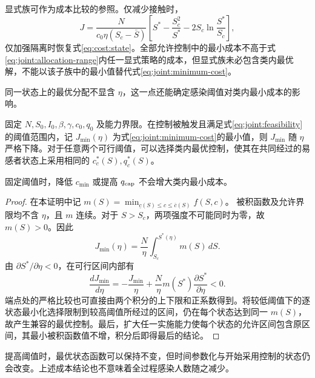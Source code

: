 \documentclass[lang=cn,a4paper,newtx]{elegantpaper}
\numberwithin{equation}{section}
\theoremstyle{plain}
\begin{document}
显式族可作为成本比较的参照。仅减少接触时，
\begin{equation}
J=\frac{N}{c_0\eta(S_c-\bar S)}
\left[S^*-\frac{S_c^2}{S^*}-2S_c\ln\frac{S^*}{S_c}\right],
\label{eq:joint:contact-cost}
\end{equation}
仅加强隔离时恢复式\eqref{eq:cost:state}。全部允许控制中的最小成本不高于式\eqref{eq:joint:allocation-range}内任一显式策略的成本，但显式族未必包含类内最优解，不能以该子族中的最小值替代式\eqref{eq:joint:minimum-cost}。


同一状态上的最优分配不显含 $\eta$，这一点还能确定感染阈值对类内最小成本的影响。
\begin{proposition}
\label{prop:joint:minimum-threshold}
固定 $N,S_0,I_0,\beta,\gamma,c_0,q_0$ 及能力界限。在控制被触发且满足式\eqref{eq:joint:feasibility}的阈值范围内，记 $J_{\min}(\eta)$ 为式\eqref{eq:joint:minimum-cost}的最小值，则 $J_{\min}$ 随 $\eta$ 严格下降。对于任意两个可行阈值，可以选择类内最优控制，使其在共同经过的易感者状态上采用相同的 $c_c^*(S),q_c^*(S)$。

固定阈值时，降低 $c_{\min}$ 或提高 $q_{\rm cap}$ 不会增大类内最小成本。
\end{proposition}
\begin{proof}
在本证明中记
$m(S)=\min_{\underline c(S)\le c\le\overline c(S)}f(S,c)$。
被积函数及允许界限均不含 $\eta$，且 $m$ 连续。对于 $S>S_c$，两项强度不可能同时为零，故 $m(S)>0$。因此
\[
J_{\min}(\eta)=\frac{N}{\eta}\int_{S_c}^{S^*(\eta)}m(S)\,dS.
\]
由 $\partial S^*/\partial\eta<0$，在可行区间内部有
\begin{equation}
\frac{dJ_{\min}}{d\eta}
=-\frac{J_{\min}}{\eta}
+\frac{N}{\eta}m(S^*)\frac{\partial S^*}{\partial\eta}<0.
\label{eq:joint:mincost-eta}
\end{equation}
端点处的严格比较也可直接由两个积分的上下限和正系数得到。将较低阈值下的逐状态最小化选择限制到较高阈值所经过的区间，仍在每个状态达到同一 $m(S)$，故产生兼容的最优控制。最后，扩大任一实施能力使每个状态的允许区间包含原区间，其最小被积函数值不增，积分后即得最后的结论。
\end{proof}
提高阈值时，最优状态函数可以保持不变，但时间参数化与开始采用控制的状态仍会改变。上述成本结论也不意味着全过程感染人数随之减少。
\end{document}
